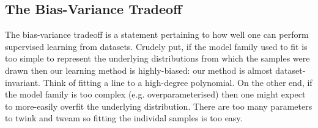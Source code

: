 \documentclass[11pt]{article}
\begin{document}
\subsection{The Bias-Variance Tradeoff}

The bias-variance tradeoff is a statement pertaining to how well one can perform supervised learning from datasets. Crudely put, if the model family used to fit is too simple to represent the underlying distributions from which the samples were drawn then our learning method is highly-biased: our method is almost dataset-invariant. Think of fitting a line to a high-degree polynomial. On the other end, if the model family is too complex (e.g. overparameterised) then one might expect to more-easily overfit the underlying distribution. There are too many parameters to twink and tweam so fitting the individal samples is too easy.
\end{document}
